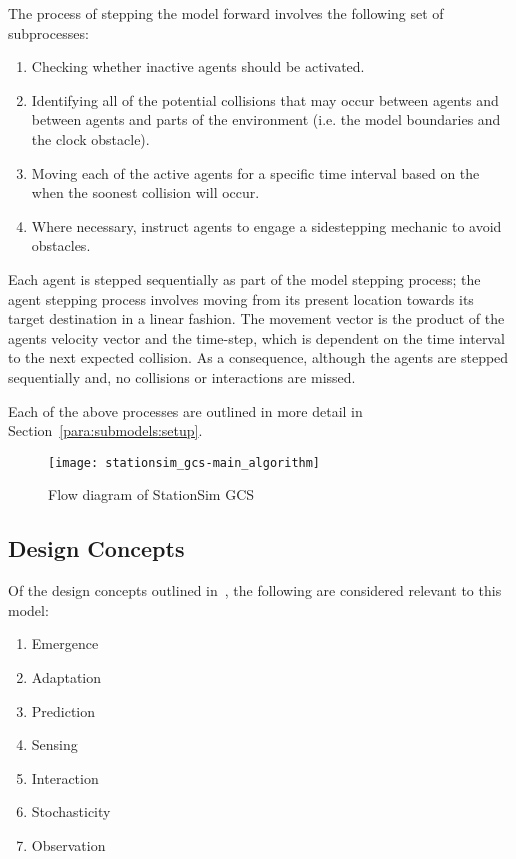 The process of stepping the model forward involves the following set of
subprocesses:
\begin{enumerate}
    \item Checking whether inactive agents should be activated.
    \item Identifying all of the potential collisions that may occur between
        agents and between agents and parts of the environment (i.e. the model
        boundaries and the clock obstacle).
    \item Moving each of the active agents for a specific time interval based on
        the when the soonest collision will occur.
    \item Where necessary, instruct agents to engage a sidestepping mechanic to
        avoid obstacles.
\end{enumerate}
Each agent is stepped sequentially as part of the model stepping process; the
agent stepping process involves moving from its present location towards its
target destination in a linear fashion.
The movement vector is the product of the agents velocity vector and the
time-step, which is dependent on the time interval to the next expected
collision.
As a consequence, although the agents are stepped sequentially and, no
collisions or interactions are missed.

Each of the above processes are outlined in more detail in
Section~\ref{para:submodels:setup}.

\begin{figure}[h]
    \centering
    \texttt{[image: stationsim\_gcs-main\_algorithm]}
    \caption{Flow diagram of StationSim GCS}\label{fig:flow:stationsim}
\end{figure}

\subsection{Design Concepts}\label{sub:stationsim:design_concepts}

Of the design concepts outlined in~\cite{grimm2010odd}, the following are
considered relevant to this model:
\begin{enumerate}
    \item Emergence
    \item Adaptation
    \item Prediction
    \item Sensing
    \item Interaction
    \item Stochasticity
    \item Observation
\end{enumerate}


